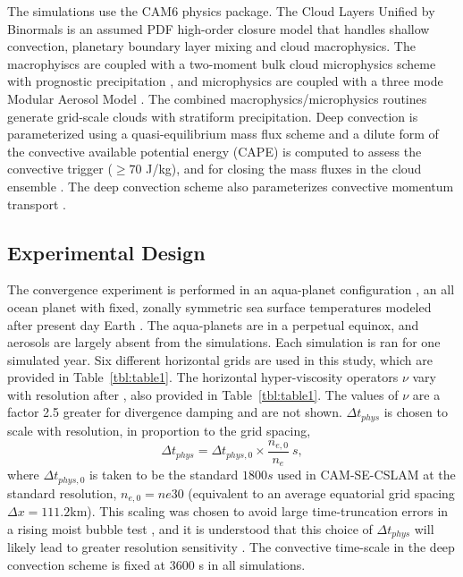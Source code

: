 The simulations use the CAM6 physics package. The Cloud Layers Unified by Binormals \citep[CLUBB][]{GETAL2002JAS,BOG2013JCLIM} is an assumed PDF high-order closure model that handles shallow convection, planetary boundary layer mixing and cloud macrophysics. The macrophyiscs are coupled with a two-moment bulk cloud microphysics scheme with prognostic precipitation \citep{MG2}, and microphysics are coupled with a three mode Modular Aerosol Model \citep{MAM}. The combined macrophysics/microphysics routines generate grid-scale clouds with stratiform precipitation. Deep convection is parameterized using a quasi-equilibrium mass flux scheme \citep{ZM1995AO} and a dilute form of the convective available potential energy (CAPE) is computed to assess the convective trigger ($\geq 70$ J/kg), and for closing the mass fluxes in the cloud ensemble \citep{NRJ2008JC}. The deep convection scheme also parameterizes convective momentum transport \citep{RR2008JC}.

\subsection{Experimental Design}
 
The convergence experiment is performed in an aqua-planet configuration \citep{NH2000ASL,MWO2016JAMES}, an all ocean planet with fixed, zonally symmetric sea surface temperatures modeled after present day Earth \citep[$QOBS$ in][]{NH2000ASL}. The aqua-planets are in a perpetual equinox, and aerosols are largely absent from the simulations. Each simulation is ran for one simulated year. Six different horizontal grids are used in this study, which are provided in Table~\ref{tbl:table1}. The horizontal hyper-viscosity operators $\nu$ vary with resolution after \cite{HETAL2019JAMES}, also provided in Table~\ref{tbl:table1}. The values of $\nu$ are a factor 2.5 greater for divergence damping and are not shown. $\Delta t_{phys}$ is chosen to scale with resolution, in proportion to the grid spacing,
\begin{equation}
\Delta t_{phys} = \Delta t_{phys,0} \times \frac{n_{e,0}}{n_e}~s,\label{eq:dt-scale}
\end{equation}
where $\Delta t_{phys,0}$ is taken to be the standard $1800 s$ used in CAM-SE-CSLAM at the standard resolution, $n_{e,0} = ne30$ (equivalent to an average equatorial grid spacing $\Delta x = 111.2$km). This scaling was chosen to avoid large time-truncation errors in a rising moist bubble test \citep[Appendix A in][]{HETAL2019JAMES}, and it is understood that this choice of $\Delta t_{phys}$ will likely lead to greater resolution sensitivity \citep{W2008TELLUS}. The convective time-scale in the deep convection scheme is fixed at 3600 s in all simulations.
 
